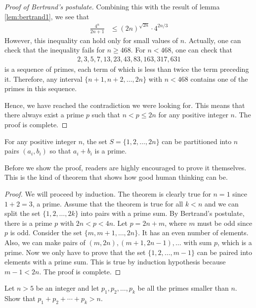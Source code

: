 \documentclass{subfile}
\begin{document}
\begin{proof}[Proof of Bertrand's postulate]
		Combining this with the result of lemma \autoref{lem:bertrand1}, we see that
		\begin{align*}
			\frac{4^n}{2n+1}
				& \leq (2n)^{\sqrt{2n}} \cdot 4^{2n/3}
		\end{align*}
		However, this inequality can hold only for small values of $n$. Actually, one can check that the inequality fails for $n \geq 468$. For $n < 468$, one can check that
		\begin{align*}
		2, 3, 5, 7, 13, 23, 43, 83, 163, 317, 631
		\end{align*}
		is a sequence of primes, each term of which is less than twice the term preceding it. Therefore, any interval $\{n+1, n+2, \ldots, 2n\}$ with $n<468$ contains one of the primes in this sequence.

		Hence, we have reached the contradiction we were looking for. This means that there always exist a prime $p$ such that $n<p\leq 2n$ for any positive integer $n$. The proof is complete.
	\end{proof}


	\begin{theorem}
		For any positive integer $n$, the set $S=\{1,2,\ldots,2n\}$ can be partitioned into $n$ pairs $(a_i,b_i)$ so that $a_i+b_i$ is a prime.
	\end{theorem}

	Before we show the proof, readers are highly encouraged to prove it themselves. This is the kind of theorem that shows how good human thinking can be.

	\begin{proof}
		We will proceed by induction. The theorem is clearly true for $n=1$ since $1+2=3$, a prime. Assume that the theorem is true for all $k<n$ and we can split the set $\{1,2,\ldots,2k\}$ into pairs with a prime sum. By Bertrand's postulate, there is a prime $p$ with $2n<p<4n$. Let $p=2n+m$, where $m$ must be odd since $p$ is odd. Consider the set $\{m,m+1, \ldots , 2n\}$. It has an even number of elements. Also, we can make pairs of $(m,2n), (m+1,2n-1), \ldots$ with sum $p$, which is a prime. Now we only have to prove that the set $\{1,2,\ldots,m-1\}$ can be paired into elements with a prime sum. This is true by induction hypothesis because $m-1<2n$. The proof is complete.
	\end{proof}

	\begin{problem}
		Let $n > 5$ be an integer and let $p_1, p_2, \ldots, p_k$ be all the primes smaller than $n$. Show that $p_1 + p_2 + \cdots + p_k >n$.
	\end{problem}
\end{document}
